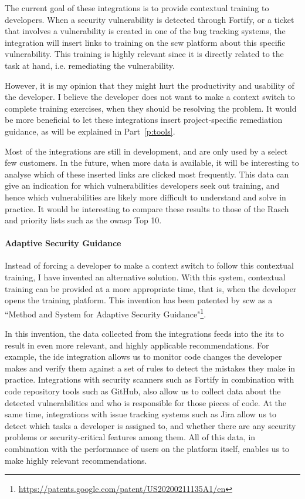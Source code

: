 The current goal of these integrations is to provide contextual training to developers.
When a security vulnerability is detected through Fortify, or a ticket that involves a vulnerability is created in one of the bug tracking systems, the integration will insert links to training on the \gls{scw} platform about this specific vulnerability.
This training is highly relevant since it is directly related to the task at hand, i.e. remediating the vulnerability.

However, it is my opinion that they might hurt the productivity and usability of the developer.
I believe the developer does not want to make a context switch to complete training exercises, when they should be resolving the problem.
It would be more beneficial to let these integrations insert project-specific remediation guidance, as will be explained in Part~\ref{p:tools}.

Most of the integrations are still in development, and are only used by a select few customers.
In the future, when more data is available, it will be interesting to analyse which of these inserted links are clicked most frequently.
This data can give an indication for which vulnerabilities developers seek out training, and hence which vulnerabilities are likely more difficult to understand and solve in practice.
It would be interesting to compare these results to those of the Rasch and priority lists such as the \gls{owasp} Top 10.

\paragraph{Adaptive Security Guidance}
Instead of forcing a developer to make a context switch to follow this contextual training, I have invented an alternative solution.
With this system, contextual training can be provided at a more appropriate time, that is, when the developer opens the training platform.
This invention has been patented by \gls{scw} as a ``Method and System for Adaptive Security Guidance"\footnote{\url{https://patents.google.com/patent/US20200211135A1/en}}.

In this invention, the data collected from the integrations feeds into the \gls{its} to result in even more relevant, and highly applicable recommendations.
For example, the \gls{ide} integration allows us to monitor code changes the developer makes and verify them against a set of rules to detect the mistakes they make in practice.
Integrations with security scanners such as Fortify in combination with code repository tools such as GitHub, also allow us to collect data about the detected vulnerabilities and who is responsible for those pieces of code.
At the same time, integrations with issue tracking systems such as Jira allow us to detect which tasks a developer is assigned to, and whether there are any security problems or security-critical features among them.
All of this data, in combination with the performance of users on the platform itself, enables us to make highly relevant recommendations.

